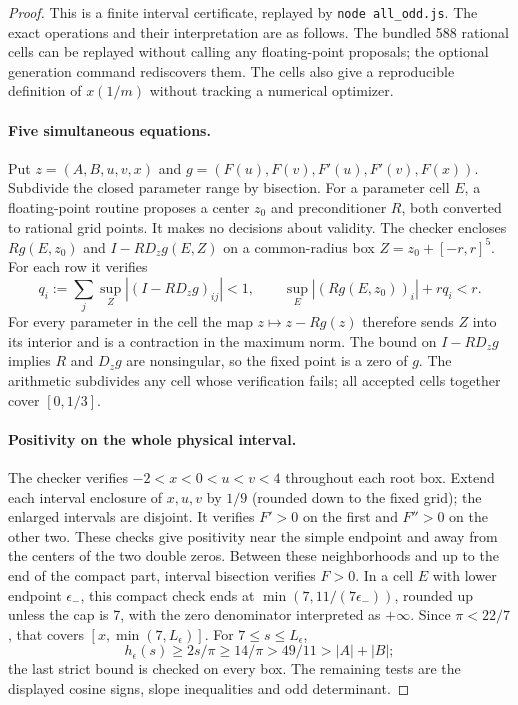 \documentclass[11pt]{article}
\begin{document}
\begin{proof}
This is a finite interval certificate, replayed by
\texttt{node all\_odd.js}. The exact operations and their interpretation
are as follows. The bundled 588 rational cells can be replayed without calling any
floating-point proposals; the optional generation command rediscovers them.
The cells also give a reproducible definition of \(x(1/m)\)
without tracking a numerical optimizer.

\paragraph{Five simultaneous equations.}
Put \(z=(A,B,u,v,x)\) and
\(g=(F(u),F(v),F'(u),F'(v),F(x))\). Subdivide the closed parameter range
by bisection. For a parameter cell \(E\), a floating-point routine proposes
a center \(z_0\) and preconditioner \(R\), both converted to rational
grid points. It makes no decisions about validity. The checker
encloses \(R g(E,z_0)\) and \(I-R D_zg(E,Z)\) on a common-radius box
\(Z=z_0+[-r,r]^5\). For each row it verifies
\[
 q_i:=\sum_j\sup_Z |(I-RD_zg)_{ij}|<1,\qquad
 \sup_E |(Rg(E,z_0))_i|+rq_i<r.
\]
For every parameter in the cell the map \(z\mapsto z-Rg(z)\)
therefore sends \(Z\) into its interior and is a contraction in
the maximum norm. The bound on \(I-RD_zg\) implies \(R\) and
\(D_zg\) are nonsingular, so the fixed point is a zero of \(g\).
The arithmetic subdivides any cell whose verification fails;
all accepted cells together cover \([0,1/3]\).

\paragraph{Positivity on the whole physical interval.}
The checker verifies \(-2<x<0<u<v<4\) throughout each root box.
Extend each interval enclosure of \(x,u,v\) by \(1/9\)
(rounded down to the fixed grid); the enlarged intervals are
disjoint. It verifies \(F'>0\) on the first and \(F''>0\) on the
other two. These checks give positivity near the simple endpoint and
away from the centers of the two double zeros. Between these
neighborhoods and up to the end of the compact part, interval
bisection verifies \(F>0\). In a cell \(E\) with lower endpoint
\(\epsilon_-\), this compact check ends at
\(\min(7,11/(7\epsilon_-))\), rounded up unless the cap is 7, with the
zero denominator interpreted as \(+\infty\). Since \(\pi<22/7\), that
covers \([x,\min(7,L_\epsilon)]\). For \(7\le s\le L_\epsilon\),
\[
 h_\epsilon(s)\ge 2s/\pi\ge14/\pi>49/11>|A|+|B|;
\]
the last strict bound is checked on every box. The remaining tests are
the displayed cosine signs, slope inequalities and odd determinant.


\end{proof}
\end{document}
